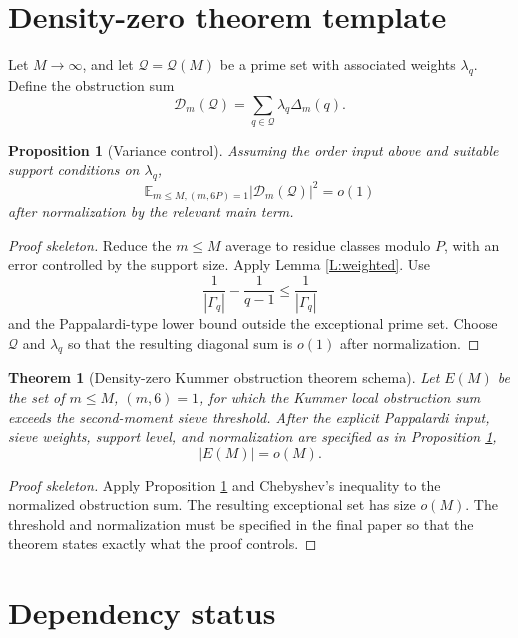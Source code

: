 \documentclass[11pt]{article}
\newtheorem{theorem}{Theorem}
\newtheorem{proposition}{Proposition}
\newcommand{\E}{\mathbb E}
\newcommand{\1}{\mathbf 1}
\begin{document}
\section{Density-zero theorem template}

Let \(M\to\infty\), and let \(\mathcal Q=\mathcal Q(M)\) be a prime set with associated weights \(\lambda_q\).  Define the obstruction sum
\[
\mathcal D_m(\mathcal Q)=\sum_{q\in\mathcal Q}\lambda_q\Delta_m(q).
\]

\begin{proposition}[Variance control]\label{P:variance}
Assuming the order input above and suitable support conditions on \(\lambda_q\),
\[
\E_{m\le M,(m,6P)=1}|\mathcal D_m(\mathcal Q)|^2=o(1)
\]
after normalization by the relevant main term.
\end{proposition}

\begin{proof}[Proof skeleton]
Reduce the \(m\le M\) average to residue classes modulo \(P\), with an error controlled by the support size.  Apply Lemma \ref{L:weighted}.  Use
\[
\frac1{|\Gamma_q|}-\frac1{q-1}\le\frac1{|\Gamma_q|}
\]
and the Pappalardi-type lower bound outside the exceptional prime set.  Choose \(\mathcal Q\) and \(\lambda_q\) so that the resulting diagonal sum is \(o(1)\) after normalization.
\end{proof}

\begin{theorem}[Density-zero Kummer obstruction theorem schema]\label{T:dz}
Let \(E(M)\) be the set of \(m\le M\), \((m,6)=1\), for which the Kummer local obstruction sum exceeds the second-moment sieve threshold.  After the explicit Pappalardi input, sieve weights, support level, and normalization are specified as in Proposition \ref{P:variance},
\[
|E(M)|=o(M).
\]
\end{theorem}

\begin{proof}[Proof skeleton]
Apply Proposition \ref{P:variance} and Chebyshev's inequality to the normalized obstruction sum.  The resulting exceptional set has size \(o(M)\).  The threshold and normalization must be specified in the final paper so that the theorem states exactly what the proof controls.
\end{proof}




\section{Dependency status}
\end{document}
